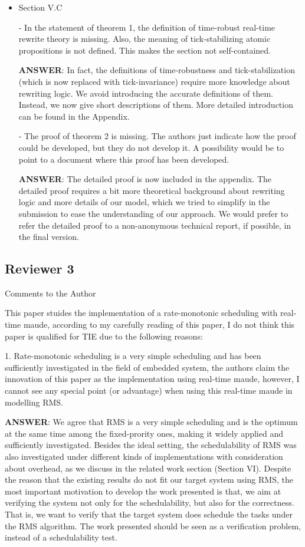 \documentclass[10pt,journal]{IEEEtran}
\newcommand{\ANSWER}{{\bf ANSWER}}
\begin{document}
\begin{itemize}
\item
Section V.C

- In the statement of theorem 1, the definition of time-robust
real-time rewrite theory is missing. Also, the meaning of
tick-stabilizing atomic propositions is not defined. This makes the
section not self-contained.

\ANSWER: In fact, the definitions of time-robustness and
tick-stabilization (which is now replaced with tick-invariance)
require more knowledge about rewriting logic. We avoid introducing the
accurate definitions of them. Instead, we now give short descriptions
of them. More detailed introduction can be found in the Appendix.

- The proof of theorem 2 is missing. The authors just indicate how the
proof could be developed, but they do not develop it. A possibility
would be to point to a document where this proof has been developed.

\ANSWER: The detailed proof is now included in the appendix.  The
detailed proof requires a bit more theoretical background about
rewriting logic and more details of our model, which we tried to
simplify in the submission to ease the understanding of our
approach. We would prefer to refer the detailed proof to a
non-anonymous technical report, if possible, in the final version.
\end{itemize}

\subsection{Reviewer 3}
Comments to the Author

This paper stuides the implementation of a rate-monotonic scheduling
with real-time maude, according to my carefully reading of this paper,
I do not think this paper is qualified for TIE due to the following
reasons:

1. Rate-monotonic scheduling is a very simple scheduling and has been
sufficiently investigated in the field of embedded system, the authors
claim the innovation of this paper as the implementation using
real-time maude, however, I cannot see any special point (or
advantage) when using this real-time maude in modelling RMS.

\ANSWER: We agree that RMS is a very simple scheduling and is the
optimum at the same time among the fixed-prority ones, making it
widely applied and sufficiently investigated. Besides the ideal
setting, the schedulability of RMS was also investigated under
different kinds of implementations with consideration about overhead,
as we discuss in the related work section (Section VI). Despite the
reason that the existing results do not fit our target system using
RMS, the most important motivation to develop the work presented is
that, we aim at verifying the system not only for the schedulability,
but also for the correctness. That is, we want to verify that the
target system does schedule the tasks under the RMS algorithm. The
work presented should be seen as a verification problem, instead of a
schedulability test.
\end{document}
